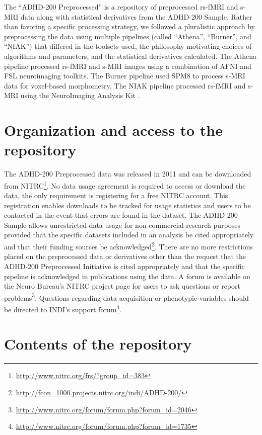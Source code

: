 \documentclass[preprint,12pt,3p]{elsarticle}
\begin{document}
The ``ADHD-200 Preprocessed'' is a repository of preprocessed rs-fMRI and s-MRI data along with statistical derivatives from the ADHD-200 Sample. Rather than favoring a specific processing strategy, we followed a pluralistic approach by preprocessing the data using multiple pipelines (called ``Athena'', ``Burner'', and ``NIAK'') that differed in the toolsets used, the philosophy motivating choices of algorithms and parameters, and the statistical derivatives calculated. The Athena pipeline processed rs-fMRI and s-MRI images using a combination of AFNI \cite{cox1996afni} and FSL \cite{smith2004advances} neuroimaging toolkits. The Burner pipeline used SPM8 \cite{ashburner2012spm8} to process s-MRI data for voxel-based morphometry. The NIAK pipeline processed rs-fMRI and s-MRI using the NeuroImaging Analysis Kit \cite{Bellec2011}. 


\section{Organization and access to the repository}

The ADHD-200 Preprocessed data was released in 2011 and can be downloaded from NITRC\footnote{\url{http://www.nitrc.org/frs/?group_id=383}}. No data usage agreement is required to access or download the data, the only requirement is registering for a free NITRC account. This registration enables downloads to be tracked for usage statistics and users to be contacted in the event that errors are found in the dataset. The ADHD-200 Sample allows unrestricted data usage for non-commercial research purposes provided that the specific datasets included in an analysis be cited appropriately and that their funding sources be acknowledged\footnote{\url{http://fcon_1000.projects.nitrc.org/indi/ADHD-200/}}. There are no more restrictions placed on the preprocessed data or derivatives other than the request that the ADHD-200 Preprocessed Initiative is cited appropriately and that the specific pipeline is acknowledged in publications using the data. A forum is available on the Neuro Bureau's NITRC project page for users to ask questions or report problems\footnote{\url{http://www.nitrc.org/forum/forum.php?forum_id=2046}}. Questions regarding data acquisition or phenotypic variables should be directed to INDI's support forum\footnote{\url{http://www.nitrc.org/forum/forum.php?forum_id=1735}}. 

\section{Contents of the repository}
\end{document}
